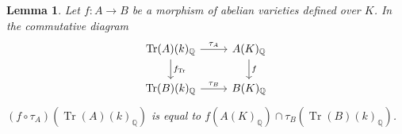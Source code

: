 \documentclass[times, doublespace]{amsart}
\numberwithin{equation}{section}
\theoremstyle{plain}
\newtheorem{lemma}[equation]{Lemma}
\theoremstyle{definition}
\DeclareMathOperator{\Pic}{Pic}
\DeclareMathOperator{\Alb}{Alb}
\renewcommand{\Im}{\operatorname{Im}}
\newcommand{\Tr}{\operatorname{Tr}}
\newcommand{\imP}[1]{\Tr_{K/k}\left(\Pic^0(#1)\right)}
\newcommand{\Q}{\mathbb{Q}}
\begin{document}

 
 \begin{lemma}\label{traceint}
 Let $f:A\to B$ be a morphism of abelian varieties defined over $K$. In the commutative diagram
 \[
 \begin{tikzcd}
 \Tr(A)(k)_{\Q}\arrow{r}{\tau_A}\arrow{d}{f_{\Tr}}&A(K)_{\Q}\arrow{d}{f}\\
 \Tr(B)(k)_{\Q}\arrow{r}{\tau_B}&B(K)_{\Q}
 \end{tikzcd}
 \]
$(f\circ \tau_A)\left(\Tr(A)(k)_{\Q}\right)$ is equal to $f(A(K)_{\Q})\cap\tau_B\left(\Tr(B)(k)_{\Q}\right)$. 
 
 \end{lemma}
\end{document}
